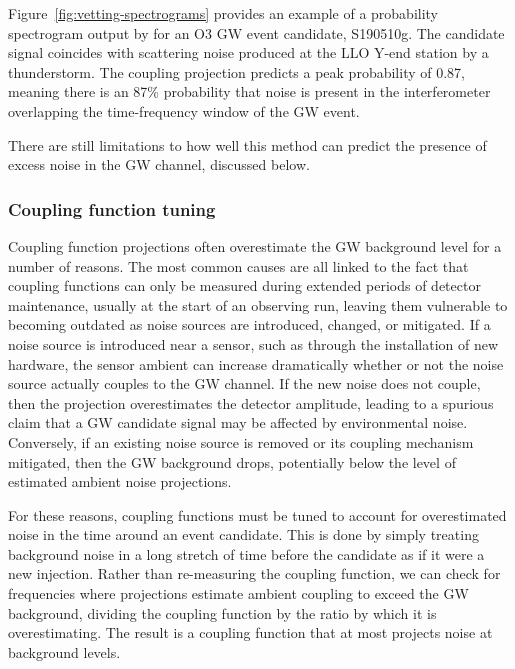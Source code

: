 Figure~\ref{fig:vetting-spectrograms} provides an example of a probability spectrogram output by  for an \ac{O3} \ac{GW} event candidate, S190510g.
The candidate signal coincides with scattering noise produced at the \ac{LLO} Y-end station by a thunderstorm.
The coupling projection predicts a peak probability of 0.87, meaning there is an 87\% probability that noise is present in the interferometer overlapping the time-frequency window of the \ac{GW} event.

There are still limitations to how well this method can predict the presence of excess noise in the \ac{GW} channel, discussed below.

\subsubsection{Coupling function tuning}

Coupling function projections often overestimate the \ac{GW} background level for a number of reasons.
The most common causes are all linked to the fact that coupling functions can only be measured during extended periods of detector maintenance, usually at the start of an observing run, leaving them vulnerable to becoming outdated as noise sources are introduced, changed, or mitigated.
If a noise source is introduced near a sensor, such as through the installation of new hardware, the sensor ambient can increase dramatically whether or not the noise source actually couples to the \ac{GW} channel.
If the new noise does not couple, then the projection overestimates the detector amplitude, leading to a spurious claim that a \ac{GW} candidate signal may be affected by environmental noise.
Conversely, if an existing noise source is removed or its coupling mechanism mitigated, then the \ac{GW} background drops, potentially below the level of estimated ambient noise projections.

For these reasons, coupling functions must be tuned to account for overestimated noise in the time around an event candidate.
This is done by simply treating background noise in a long stretch of time before the candidate as if it were a new injection.
Rather than re-measuring the coupling function, we can check for frequencies where projections estimate ambient coupling to exceed the \ac{GW} background, dividing the coupling function by the ratio by which it is overestimating.
The result is a coupling function that at most projects noise at background levels.

